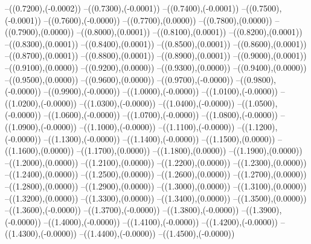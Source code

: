{	--({\sx*(0.7200)},{\sy*(-0.0002)})
	--({\sx*(0.7300)},{\sy*(-0.0001)})
	--({\sx*(0.7400)},{\sy*(-0.0001)})
	--({\sx*(0.7500)},{\sy*(-0.0001)})
	--({\sx*(0.7600)},{\sy*(-0.0000)})
	--({\sx*(0.7700)},{\sy*(0.0000)})
	--({\sx*(0.7800)},{\sy*(0.0000)})
	--({\sx*(0.7900)},{\sy*(0.0000)})
	--({\sx*(0.8000)},{\sy*(0.0001)})
	--({\sx*(0.8100)},{\sy*(0.0001)})
	--({\sx*(0.8200)},{\sy*(0.0001)})
	--({\sx*(0.8300)},{\sy*(0.0001)})
	--({\sx*(0.8400)},{\sy*(0.0001)})
	--({\sx*(0.8500)},{\sy*(0.0001)})
	--({\sx*(0.8600)},{\sy*(0.0001)})
	--({\sx*(0.8700)},{\sy*(0.0001)})
	--({\sx*(0.8800)},{\sy*(0.0001)})
	--({\sx*(0.8900)},{\sy*(0.0001)})
	--({\sx*(0.9000)},{\sy*(0.0001)})
	--({\sx*(0.9100)},{\sy*(0.0000)})
	--({\sx*(0.9200)},{\sy*(0.0000)})
	--({\sx*(0.9300)},{\sy*(0.0000)})
	--({\sx*(0.9400)},{\sy*(0.0000)})
	--({\sx*(0.9500)},{\sy*(0.0000)})
	--({\sx*(0.9600)},{\sy*(0.0000)})
	--({\sx*(0.9700)},{\sy*(-0.0000)})
	--({\sx*(0.9800)},{\sy*(-0.0000)})
	--({\sx*(0.9900)},{\sy*(-0.0000)})
	--({\sx*(1.0000)},{\sy*(-0.0000)})
	--({\sx*(1.0100)},{\sy*(-0.0000)})
	--({\sx*(1.0200)},{\sy*(-0.0000)})
	--({\sx*(1.0300)},{\sy*(-0.0000)})
	--({\sx*(1.0400)},{\sy*(-0.0000)})
	--({\sx*(1.0500)},{\sy*(-0.0000)})
	--({\sx*(1.0600)},{\sy*(-0.0000)})
	--({\sx*(1.0700)},{\sy*(-0.0000)})
	--({\sx*(1.0800)},{\sy*(-0.0000)})
	--({\sx*(1.0900)},{\sy*(-0.0000)})
	--({\sx*(1.1000)},{\sy*(-0.0000)})
	--({\sx*(1.1100)},{\sy*(-0.0000)})
	--({\sx*(1.1200)},{\sy*(-0.0000)})
	--({\sx*(1.1300)},{\sy*(-0.0000)})
	--({\sx*(1.1400)},{\sy*(-0.0000)})
	--({\sx*(1.1500)},{\sy*(0.0000)})
	--({\sx*(1.1600)},{\sy*(0.0000)})
	--({\sx*(1.1700)},{\sy*(0.0000)})
	--({\sx*(1.1800)},{\sy*(0.0000)})
	--({\sx*(1.1900)},{\sy*(0.0000)})
	--({\sx*(1.2000)},{\sy*(0.0000)})
	--({\sx*(1.2100)},{\sy*(0.0000)})
	--({\sx*(1.2200)},{\sy*(0.0000)})
	--({\sx*(1.2300)},{\sy*(0.0000)})
	--({\sx*(1.2400)},{\sy*(0.0000)})
	--({\sx*(1.2500)},{\sy*(0.0000)})
	--({\sx*(1.2600)},{\sy*(0.0000)})
	--({\sx*(1.2700)},{\sy*(0.0000)})
	--({\sx*(1.2800)},{\sy*(0.0000)})
	--({\sx*(1.2900)},{\sy*(0.0000)})
	--({\sx*(1.3000)},{\sy*(0.0000)})
	--({\sx*(1.3100)},{\sy*(0.0000)})
	--({\sx*(1.3200)},{\sy*(0.0000)})
	--({\sx*(1.3300)},{\sy*(0.0000)})
	--({\sx*(1.3400)},{\sy*(0.0000)})
	--({\sx*(1.3500)},{\sy*(0.0000)})
	--({\sx*(1.3600)},{\sy*(-0.0000)})
	--({\sx*(1.3700)},{\sy*(-0.0000)})
	--({\sx*(1.3800)},{\sy*(-0.0000)})
	--({\sx*(1.3900)},{\sy*(-0.0000)})
	--({\sx*(1.4000)},{\sy*(-0.0000)})
	--({\sx*(1.4100)},{\sy*(-0.0000)})
	--({\sx*(1.4200)},{\sy*(-0.0000)})
	--({\sx*(1.4300)},{\sy*(-0.0000)})
	--({\sx*(1.4400)},{\sy*(-0.0000)})
	--({\sx*(1.4500)},{\sy*(-0.0000)})
}
